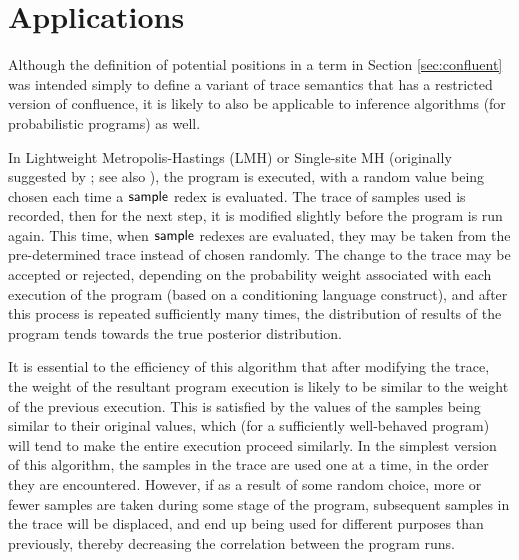 \section{Applications}
\label{sec:applications}
Although the definition of potential positions in a term in Section \ref{sec:confluent} was intended simply to define a variant of trace semantics that has a restricted version of confluence, it is likely to also be applicable to inference algorithms (for probabilistic programs) as well.


In Lightweight Metropolis-Hastings (LMH) or Single-site MH (originally suggested by \cite{wingate2011lightweight}; see also \cite{rainforth2017Automating}),
the program is executed, with a random value being chosen each time a $\mathsf{sample}$ redex is evaluated. The trace of samples used is recorded, then for the next step, it is modified slightly before the program is run again. This time, when $\mathsf{sample}$ redexes are evaluated, they may be taken from the pre-determined trace instead of chosen randomly. The change to the trace may be accepted or rejected, depending on the probability weight associated with each execution of the program (based on a conditioning language construct), and after this process is repeated sufficiently many times, the distribution of results of the program tends towards the true posterior distribution.

It is essential to the efficiency of this algorithm that after modifying the trace, the weight of the resultant program execution is likely to be similar to the weight of the previous execution. This is satisfied by the values of the samples being similar to their original values, which (for a sufficiently well-behaved program) will tend to make the entire execution proceed similarly. In the simplest version of this algorithm, the samples in the trace are used one at a time, in the order they are encountered. However, if as a result of some random choice, more or fewer samples are taken during some stage of the program, subsequent samples in the trace will be displaced, and end up being used for different purposes than previously, thereby decreasing the correlation between the program runs.

